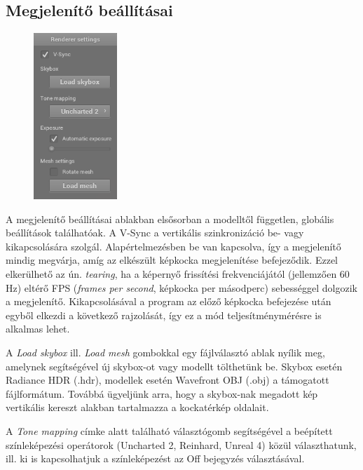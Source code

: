 \clearpage

\subsection{Megjelenítő beállításai}

\begin{figure}
    \vspace{-23pt}
    \includegraphics[width=0.28\textwidth]{images/renderer_settings.png}
    \vspace{-20pt}
\end{figure}

A megjelenítő beállításai ablakban elsősorban a modelltől független, globális beállítások találhatóak. A V-Sync a vertikális szinkronizáció be- vagy kikapcsolására szolgál. Alapértelmezésben be van kapcsolva, így a megjelenítő mindig megvárja, amíg az elkészült képkocka megjelenítése befejeződik. Ezzel elkerülhető az ún. \textit{tearing}, ha a képernyő frissítési frekvenciájától (jellemzően 60 Hz) eltérő FPS (\textit{frames per second}, képkocka per másodperc) sebességgel dolgozik a megjelenítő. Kikapcsolásával a program az előző képkocka befejezése után egyből elkezdi a következő rajzolását, így ez a mód teljesítménymérésre is alkalmas lehet.

A \textit{Load skybox} ill. \textit{Load mesh} gombokkal egy fájlválasztó ablak nyílik meg, amelynek segítségével új skybox-ot vagy modellt tölthetünk be. Skybox esetén Radiance HDR (.hdr), modellek esetén Wavefront OBJ (.obj) a támogatott fájlformátum. Továbbá ügyeljünk arra, hogy a skybox-nak megadott kép vertikális kereszt alakban tartalmazza a kockatérkép oldalait.

A \textit{Tone mapping} címke alatt található választógomb segítségével a beépített színleképezési operátorok (Uncharted 2, Reinhard, Unreal 4) közül választhatunk, ill. ki is kapcsolhatjuk a színleképezést az Off bejegyzés választásával.

